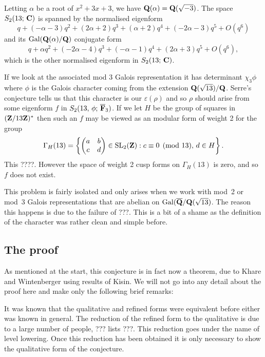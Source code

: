 \documentclass[a4paper,12pt]{article}
\begin{document}
\begin{ex}
Letting $\alpha$ be a root of $x^2 + 3x+ 3$, we have $\mathbf{Q}(\alpha) = \mathbf{Q} (\sqrt{-3})$.
The space $S_2(13;\,\mathbf{C})$ is spanned by the normalised eigenform
\[
q + (-\alpha - 3)q^{2} + (2 \alpha + 2)q^{3} + (\alpha + 2)q^{4} + (-2 \alpha - 3)q^{5} + O(q^{6})
\]
and its $\operatorname{Gal}(\mathbf{Q}(\alpha)/\mathbf{Q})$ conjugate form
\[
q + \alpha q^{2} + (-2 \alpha - 4)q^{3} + (-\alpha - 1)q^{4} + (2 \alpha + 3)q^{5} + O(q^{6}),
\]
which is the other normalised eigenform in $S_2(13;\,\mathbf{C})$.

If we look at the associated mod 3 Galois representation it has determinant $\chi_3 \phi$ where $\phi$ is the Galois character coming from the extension $\mathbf{Q}(\sqrt{13})/\mathbf{Q}$.
Serre's conjecture tells us that this character is our $\varepsilon(\rho)$ and so $\rho$ should arise from some eigenform $f$ in $S_2(13,\,\phi;\,\overline{\mathbf{F}}_3)$.
If we let $H$ be the group of squares in $(\mathbf{Z}/13\mathbf{Z})^*$ then such an $f$ may be viewed as an modular form of weight 2 for the group
\[
\Gamma_H(13) = \left\{ \begin{pmatrix} a & b\\ c & d\\ \end{pmatrix} \in \operatorname{SL}_2(\mathbf{Z}) : c \equiv 0 \pmod{13},\,d \in H\right\}.
\]
This ????.
However the space of weight 2 cusp forms on $\Gamma_H(13)$ is zero, and so $f$ does not exist.
\end{ex}


This problem is fairly isolated and only arises when we work with mod~2 or mod~3 Galois representations that are abelian on $\operatorname{Gal}(\overline{\mathbf{Q}}/\mathbf{Q}(\sqrt{13})$. %
The reason this happens is due to the failure of ???.
This is a bit of a shame as the definition of the character was rather clean and simple before.


\subsection{The proof}
As mentioned at the start, this conjecture is in fact now a theorem, due to Khare and Wintenberger using results of Kisin.
We will not go into any detail about the proof here and make only the following brief remarks:

It was known that the qualitative and refined forms were equivalent before either was known in general.
The reduction of the refined form to the qualitative is due to a large number of people, ??? lists ???.
This reduction goes under the name of level lowering. %
Once this reduction has been obtained it is only necessary to show the qualitative form of the conjecture.
\end{document}
